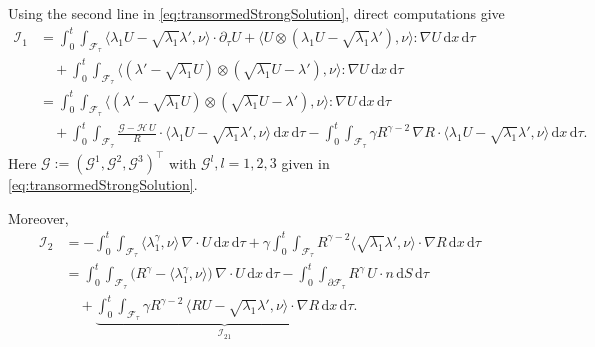 \documentclass[11pt,twoside,reqno]{amsart}
\numberwithin{equation}{section}
\numberwithin{figure}{section}
\begin{document}
Using the second line in \eqref{eq:transormedStrongSolution}, direct computations give
\begin{equation}\label{eq:I_1}
\begin{aligned}
\mathcal{I}_1
&=\int_0^t\!\!\int_{\mathcal{F}_\tau}
  \big\langle \lambda_1U-\sqrt{\lambda_1}\lambda',\nu\big\rangle\!\cdot \partial_\tau U
 +\big\langle U\otimes(\lambda_1U-\sqrt{\lambda_1}\lambda'),\nu\big\rangle\!:\!\nabla U\,\mathrm{d}x\,\mathrm{d}\tau\\
&\quad+\int_0^t\!\!\int_{\mathcal{F}_\tau}
  \big\langle (\lambda'-\sqrt{\lambda_1}U)\otimes(\sqrt{\lambda_1}U-\lambda'),\nu\big\rangle\!:\!\nabla U\,\mathrm{d}x\,\mathrm{d}\tau\\
&=\int_0^t\!\!\int_{\mathcal{F}_\tau}
  \big\langle (\lambda'-\sqrt{\lambda_1}U)\otimes(\sqrt{\lambda_1}U-\lambda'),\nu\big\rangle\!:\!\nabla U\,\mathrm{d}x\,\mathrm{d}\tau\\
&\quad+\int_0^t\!\!\int_{\mathcal{F}_\tau}
  \frac{\mathcal{G}-\mathcal{H}\,U}{R}\cdot \big\langle \lambda_1U-\sqrt{\lambda_1}\lambda',\nu\big\rangle\,\mathrm{d}x\,\mathrm{d}\tau
 -\int_0^t\!\!\int_{\mathcal{F}_\tau}
  \gamma R^{\gamma-2}\,\nabla R\cdot \big\langle \lambda_1U-\sqrt{\lambda_1}\lambda',\nu\big\rangle\,\mathrm{d}x\,\mathrm{d}\tau.
\end{aligned}
\end{equation}
Here $\mathcal{G}:=(\mathcal{G}^1, \mathcal{G}^2, \mathcal{G}^3)^\top$ with $\mathcal{G}^l, l=1,2,3$ given in \eqref{eq:transormedStrongSolution}.

Moreover,
\begin{equation}\label{eq:I_2}
\begin{aligned}
\mathcal{I}_2
&=-\int_0^t\!\!\int_{\mathcal{F}_\tau}\langle \lambda_1^\gamma,\nu\rangle\,\nabla\!\cdot U\,\mathrm{d}x\,\mathrm{d}\tau
   +\gamma\int_0^t\!\!\int_{\mathcal{F}_\tau} R^{\gamma-2}\Big\langle \sqrt{\lambda_1}\lambda',\nu\Big\rangle\!\cdot\nabla R\,\mathrm{d}x\,\mathrm{d}\tau\\
&=\int_0^t\!\!\int_{\mathcal{F}_\tau}\big(R^\gamma-\langle \lambda_1^\gamma,\nu\rangle\big)\,\nabla\!\cdot U\,\mathrm{d}x\,\mathrm{d}\tau
  -\int_0^t\!\!\int_{\partial\mathcal{F}_\tau}R^\gamma\,U\cdot n\,\mathrm{d}S\,\mathrm{d}\tau\\
&\quad+\underbrace{\int_0^t\!\!\int_{\mathcal{F}_\tau}\gamma R^{\gamma-2}\,\big\langle RU-\sqrt{\lambda_1}\lambda',\nu\big\rangle\!\cdot\nabla R\,\mathrm{d}x\,\mathrm{d}\tau}_{\mathcal{I}_{21}}.
\end{aligned}
\end{equation}
\end{document}

